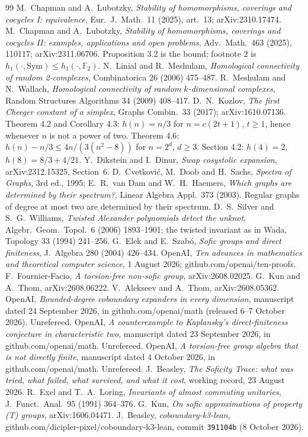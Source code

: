 \documentclass[11pt]{article}
\theoremstyle{remark}\newtheorem{remark}[theorem]{Remark}
\newcommand{\Sym}{\mathrm{Sym}}\newcommand{\dH}{d_H}\newcommand{\F}{\mathbb{F}}\newcommand{\Z}{\mathbb{Z}}
\begin{document}
\renewcommand{\refname}{Sources}
\begin{thebibliography}{99}\small
{} M.~Chapman and A.~Lubotzky, \emph{Stability of homomorphisms, coverings and cocycles I: equivalence}, Eur.\ J.\ Math.\ 11 (2025), art.\ 13; arXiv:2310.17474.
 M.~Chapman and A.~Lubotzky, \emph{Stability of homomorphisms, coverings and cocycles II: examples, applications and open problems}, Adv.\ Math.\ 463 (2025), 110117; arXiv:2311.06706. Proposition 3.2 is the bound; footnote 2 is $h_1(\cdot,\Sym)\le h_1(\cdot,\F_2)$.
 N.~Linial and R.~Meshulam, \emph{Homological connectivity of random 2-complexes}, Combinatorica 26 (2006) 475--487.
 R.~Meshulam and N.~Wallach, \emph{Homological connectivity of random $k$-dimensional complexes}, Random Structures Algorithms 34 (2009) 408--417.
 D.~N.~Kozlov, \emph{The first Cheeger constant of a simplex}, Graphs Combin.\ 33 (2017); arXiv:1610.07136. Theorem 4.2 and Corollary 4.3: $h(n)=n/3$ for $n=c(2t+1)$, $t\ge1$, hence whenever $n$ is not a power of two. Theorem 4.6: $h(n)-n/3\le 4n/(3(n^2-8))$ for $n=2^d$, $d\ge3$. Section 4.2: $h(4)=2$, $h(8)=8/3+4/21$.
 Y.~Dikstein and I.~Dinur, \emph{Swap cosystolic expansion}, arXiv:2312.15325, Section~6.
 D.~Cvetkovi\'{c}, M.~Doob and H.~Sachs, \emph{Spectra of Graphs}, 3rd ed., 1995; E.~R.~van Dam and W.~H.~Haemers, \emph{Which graphs are determined by their spectrum?}, Linear Algebra Appl.\ 373 (2003). Regular graphs of degree at most two are determined by their spectrum.
 D.~S.~Silver and S.~G.~Williams, \emph{Twisted Alexander polynomials detect the unknot}, Algebr.\ Geom.\ Topol.\ 6 (2006) 1893--1901; the twisted invariant as in Wada, Topology 33 (1994) 241--256.
 G.~Elek and E.~Szab\'o, \emph{Sofic groups and direct finiteness}, J.\ Algebra 280 (2004) 426--434.
 OpenAI, \emph{Ten advances in mathematics and theoretical computer science}, 1 August 2026; github.com/openai/ten-proofs.
 F.~Fournier-Facio, \emph{A torsion-free non-sofic group}, arXiv:2608.02025.
 G.~Kun and A.~Thom, arXiv:2608.06222.
 V.~Alekseev and A.~Thom, arXiv:2608.05362.
 OpenAI, \emph{Bounded-degree coboundary expanders in every dimension}, manuscript dated 24 September 2026, in github.com/openai/math (released 6--7 October 2026). Unrefereed.
 OpenAI, \emph{A counterexample to Kaplansky's direct-finiteness conjecture in characteristic two}, manuscript dated 23 September 2026, in github.com/openai/math. Unrefereed.
 OpenAI, \emph{A torsion-free group algebra that is not directly finite}, manuscript dated 4 October 2026, in github.com/openai/math. Unrefereed.
 J.~Beasley, \emph{The Soficity Trace: what was tried, what failed, what survived, and what it cost}, working record, 23 August 2026.
 R.~Exel and T.~A.~Loring, \emph{Invariants of almost commuting unitaries}, J.\ Funct.\ Anal.\ 95 (1991) 364--376.
 G.~Kun, \emph{On sofic approximations of property (T) groups}, arXiv:1606.04471.
 J.~Beasley, \emph{coboundary-k3-lean}, github.com/dicipler-pixel/coboundary-k3-lean, commit \texttt{391104b} (8 October 2026).
\end{thebibliography}
\end{document}
